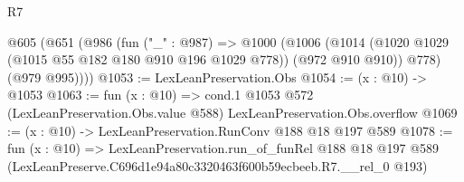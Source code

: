 \begin{lexlean}{R7}
\begin{coremodule}
  @605
    (@651
      (@986
        (fun ("_" : @987) =>
        @1000
          (@1006
            (@1014 (@1020 @1029 (@1015 @55 @182 @180 @910 @196 @1029 @778)) (@972 @910 @910))
            @778)
          (@979 @995))))
@1053 := LexLeanPreservation.Obs
@1054 := (x : @10) -> @1053
@1063 := fun (x : @10) =>
  cond.{1} @1053 @572 (LexLeanPreservation.Obs.value @588) LexLeanPreservation.Obs.overflow
@1069 := (x : @10) -> LexLeanPreservation.RunConv @188 @18 @197 @589
@1078 := fun (x : @10) =>
  LexLeanPreservation.run_of_funRel
    @188
    @18
    @197
    @589
    (LexLeanPreserve.C696d1e94a80c3320463f600b59ecbeeb.R7.__rel_0 @193)
\end{coremodule}
\end{lexlean}
